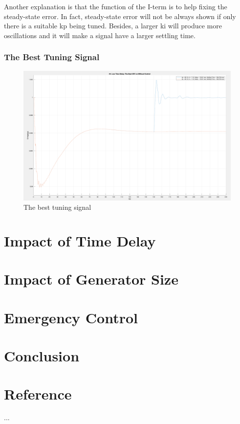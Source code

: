 \documentclass{report}
\begin{document}
Another explanation is that the function of the I-term is to help fixing the steady-state error. In fact, steady-state error will not be always shown if only there is a suitable kp being tuned. Besides, a larger ki will produce more oscillations and it will make a signal have a larger settling time. \\


\subsection{The Best Tuning Signal} %

\begin{figure}[htbp]
\centering
\includegraphics[width = .819\textwidth]{figure/4_4_2_best.png}
\caption{The best tuning signal}
\label{4_4_2_best}
\end{figure}


\chapter{Impact of Time Delay}
\label{Chapter5}



\chapter{Impact of Generator Size}
\label{Chapter6}


\chapter{Emergency Control}
\label{Chapter7}


\chapter{Conclusion}
\label{Chapter8}


\appendix
\chapter{Reference}
...


\end{document}
